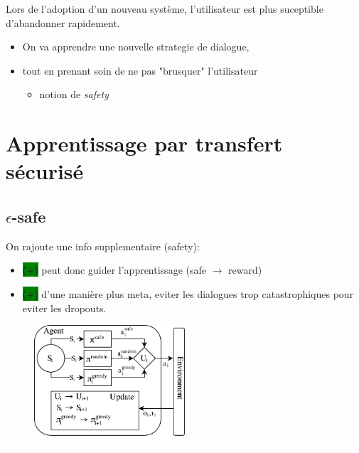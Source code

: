 \documentclass[french,handout]{beamer}
\newcommand{\cplus}{\colorbox{green}{(+)} }
\begin{document}
    \begin{frame}
        Lors de l'adoption d'un nouveau système, l'utilisateur est plus suceptible d'abandonner rapidement.
        \begin{block}{}
            \begin{itemize}
                \item On va apprendre une nouvelle strategie de dialogue,
                \item tout en prenant soin de ne pas "brusquer" l'utilisateur
                \begin{itemize}\item notion de \textit{safety}\end{itemize}
            \end{itemize}
        \end{block}

    \end{frame}

    \section{Apprentissage par transfert sécurisé}

    \subsection{$\epsilon$-safe}

    \begin{frame}
        On rajoute une info supplementaire (safety): %
        \begin{itemize}
            \item \cplus peut donc guider l'apprentissage (safe $\rightarrow$ reward)
            \item \cplus d'une manière plus meta, eviter les dialogues trop catastrophiques pour eviter les dropouts.
        \end{itemize}

    \end{frame}

    \begin{frame}

        \begin{figure}
            \begin{center}
                \includegraphics[width=0.5\textwidth]{img/transfer7.pdf}
            \end{center}
        \end{figure}

    \end{frame}
\end{document}
